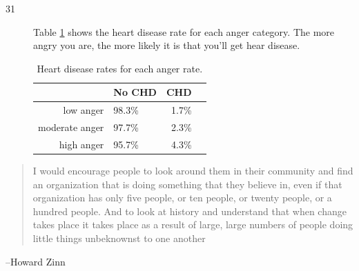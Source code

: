 \documentclass[letterpaper, landscape]{exam}
\begin{document}
\begin{description}
    \item[31]
      Table \ref{tab:ex31} shows the heart disease rate for each anger category.
      The more angry you are, the more likely it is that you'll get hear
      disease.

      \begin{table}[H]
        \centering
        \begin{tabular}{rlrr}
          \toprule
                         & No CHD   & CHD \\
          \midrule
          low anger      & 98.3\%   & 1.7\% \\
          moderate anger & 97.7\%   & 2.3\% \\
          high anger     & 95.7\%   & 4.3\% \\
          \bottomrule
        \end{tabular}
        \caption{Heart disease rates for each anger rate.}
        \label{tab:ex31}
      \end{table}

  \end{description}

  \else
    \vspace{10 cm}
    \begin{quote}
      \begin{em}
        I would encourage people to look around them in their community and find an
        organization that is doing something that they believe in, even if that
        organization has only five people, or ten people, or twenty people, or a hundred
        people. And to look at history and understand that when change takes place it
        takes place as a result of large, large numbers of people doing little things
        unbeknownst to one another
      \end{em}
    \end{quote}
    \hspace{1 cm} --Howard Zinn
  \fi
\end{document}
